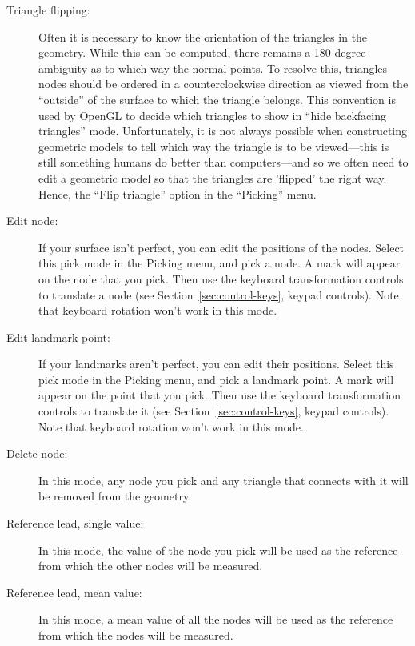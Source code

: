 \begin{description}
  \item[Triangle flipping: ] Often it is necessary to know the orientation
    of the triangles in the geometry.  While this can be computed, there
    remains a 180-degree ambiguity as to which way the normal points.  To
    resolve this, triangles nodes should be ordered in a counterclockwise
    direction as viewed from the ``outside'' of the surface to which the
    triangle belongs.  This convention is used by OpenGL to decide which
    triangles to show in ``hide backfacing triangles'' mode.
    Unfortunately, it is not always possible when constructing geometric
    models to tell which way the triangle is to be viewed---this is still
    something humans do better than computers---and so we often need to
    edit a geometric model so that the triangles are 'flipped' the right
    way.  Hence, the ``Flip triangle'' option in the ``Picking'' menu.
    
  \item[Edit node: ] If your surface isn't perfect, you can edit the
    positions of the nodes.  Select this pick mode in the Picking menu, and
    pick a node.  A mark will appear on the node that you pick.  Then use
    the keyboard transformation controls to translate a node (see
    Section~\ref{sec:control-keys}, keypad controls).  Note that keyboard
    rotation won't work in this mode.
    
  \item[Edit landmark point: ] If your landmarks aren't perfect, you can
    edit their positions.  Select this pick mode in the Picking menu, and
    pick a landmark point.  A mark will appear on the point that you pick.
    Then use the keyboard transformation controls to translate it (see
    Section~\ref{sec:control-keys}, keypad controls).  Note that keyboard
    rotation won't work in this mode.
    
  \item[Delete node: ] In this mode, any node you pick and any triangle
    that connects with it will be removed from the geometry.
    
  \item[Reference lead, single value: ] In this mode, the value of the node
    you pick will be used as the reference from which the other nodes will
    be measured.
    
  \item[Reference lead, mean value: ] In this mode, a mean value of all the
    nodes will be used as the reference from which the nodes will be
    measured.
\end{description}

